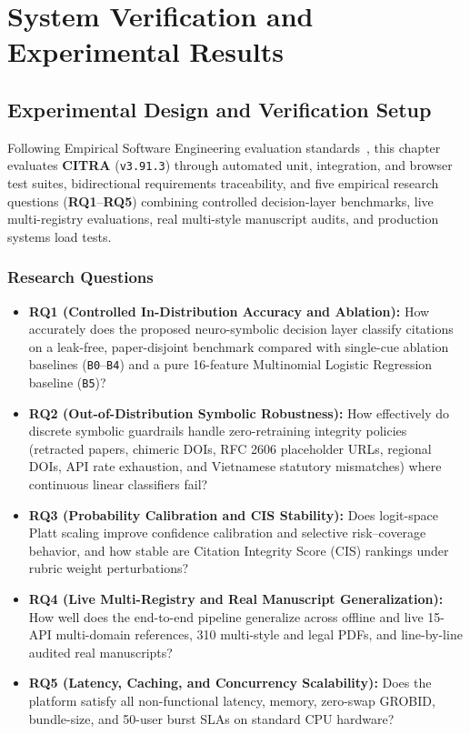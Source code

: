 \chapter{System Verification and Experimental Results}
\label{chap:results}

\section{Experimental Design and Verification Setup}

Following Empirical Software Engineering evaluation standards~\cite{wohlin2012experimentation}, this chapter evaluates \textbf{CITRA} (\texttt{v3.91.3}) through automated unit, integration, and browser test suites, bidirectional requirements traceability, and five empirical research questions (\textbf{RQ1}--\textbf{RQ5}) combining controlled decision-layer benchmarks, live multi-registry evaluations, real multi-style manuscript audits, and production systems load tests.

\subsection{Research Questions}

\begin{itemize}
    \item \textbf{RQ1 (Controlled In-Distribution Accuracy and Ablation):} How accurately does the proposed neuro-symbolic decision layer classify citations on a leak-free, paper-disjoint benchmark compared with single-cue ablation baselines (\texttt{B0}--\texttt{B4}) and a pure 16-feature Multinomial Logistic Regression baseline (\texttt{B5})?
    \item \textbf{RQ2 (Out-of-Distribution Symbolic Robustness):} How effectively do discrete symbolic guardrails handle zero-retraining integrity policies (retracted papers, chimeric DOIs, RFC 2606 placeholder URLs, regional DOIs, API rate exhaustion, and Vietnamese statutory mismatches) where continuous linear classifiers fail?
    \item \textbf{RQ3 (Probability Calibration and CIS Stability):} Does logit-space Platt scaling improve confidence calibration and selective risk--coverage behavior, and how stable are Citation Integrity Score (CIS) rankings under rubric weight perturbations?
    \item \textbf{RQ4 (Live Multi-Registry and Real Manuscript Generalization):} How well does the end-to-end pipeline generalize across offline and live 15-API multi-domain references, 310 multi-style and legal PDFs, and line-by-line audited real manuscripts?
    \item \textbf{RQ5 (Latency, Caching, and Concurrency Scalability):} Does the platform satisfy all non-functional latency, memory, zero-swap GROBID, bundle-size, and 50-user burst SLAs on standard CPU hardware?
\end{itemize}

